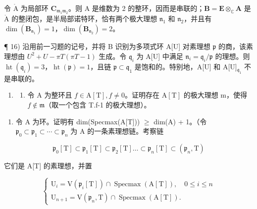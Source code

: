 令 \(\mathring{\mathrm{A}}\) 为局部环 \(\mathbf{C}_{\mathfrak{m}_1\mathfrak{m}_2}\)。则 A 是维数为 2 的整环，因而是串联的；\(\mathbf{B} = \mathbf{E} \otimes_{\mathbb{C}} \mathbf{A}\) 是 \(\mathring{\mathrm{A}}\) 的整闭包，是半局部诺特环，恰有两个极大理想 \(\mathfrak{n}_1\) 和 \(\mathfrak{n}_2\)，并且有 \(\dim(\mathbf{B}_{\mathfrak{n}_1}) = 1\)，\(\dim(\mathbf{B}_{\mathfrak{n}_2}) = 2\)。

¶ 16) 沿用前一习题的记号，并将 B 识别为多项式环 A{[}U{]} 对素理想 \(\mathfrak{p}\) 的商，该素理想由 \(U^2 + U - \pi T(\pi T - 1)\) 生成。令 \(\mathfrak{q}_i\) 为 A{[}U{]} 中满足 \(\mathfrak{n}_i = \mathfrak{q}_i/\mathfrak{p}\) 的理想。则 \(\operatorname{ht}(\mathfrak{q}_i) = 3\)，\(\operatorname{ht}(\mathfrak{p}) = 1\)，且链 \(\mathfrak{p} \subset \mathfrak{q}_1\) 是饱和的。特别地，A{[}U{]} 和 A{[}U{]}\(_{\mathfrak{q}_1}\) 不是串联的。

\begin{enumerate}
\def\labelenumi{\arabic{enumi})}
\setcounter{enumi}{16}
\tightlist
\item
  \begin{enumerate}
  \def\labelenumii{\alph{enumii})}
  \tightlist
  \item
    令 A 为整环且 \(f \in \mathrm{A}[\mathrm{T}], f \neq 0\)。证明存在 \(\mathrm{A}[\mathrm{T}]\) 的极大理想 m，使得 \(f \notin \mathfrak{m}\)（取一个包含 T.f-1 的极大理想）。
  \end{enumerate}
\end{enumerate}

\begin{enumerate}
\def\labelenumi{\alph{enumi})}
\setcounter{enumi}{1}
\tightlist
\item
  令 A 为环。证明有 dim(Specmax(A{[}T{]})) \(\geqslant\) dim(A) + 1。（令 \(\mathfrak{p}_0\subset \mathfrak{p}_1\subset \cdots \subset \mathfrak{p}_n\) 为 A 的一条素理想链。考察链
\end{enumerate}

\[
\mathfrak {p} _ {0} [ \mathrm{T} ] \subset \mathfrak {p} _ {1} [ \mathrm{T} ] \subset \mathfrak {p} _ {2} [ \mathrm{T} ] \dots \subset \mathfrak {p} _ {n} [ \mathrm{T} ] \subset (\mathfrak {p} _ {n}, \mathrm{T})
\]

它们是 A{[}T{]} 的素理想，并置

\[
\left\{ \begin{array}{l} \mathrm{U} _ {i} = \mathrm{V} (\mathfrak {p} _ {i} [ \mathrm{T} ]) \cap \operatorname{Specmax} (\mathrm{A} [ \mathrm{T} ]), \quad 0 \leqslant i \leqslant n \\ \mathrm{U} _ {n + 1} = \mathrm{V} (\mathfrak {p} _ {n}, \mathrm{T}) \cap \operatorname{Specmax} (\mathrm{A} [ \mathrm{T} ]). \end{array} \right.
\]

